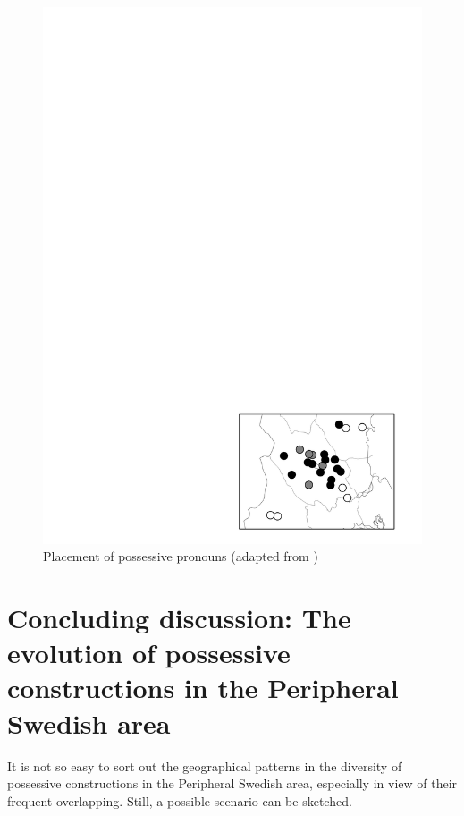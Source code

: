 \begin{figure}[h]

\includegraphics{figures_mod/image21}
\caption{Placement of possessive pronouns (adapted from \citet{Delsing2003a})}
\label{map:21}

\end{figure}

\section{Concluding discussion: The evolution of possessive constructions in the Peripheral Swedish area}

It is not so easy to sort out the geographical patterns in the diversity of possessive constructions in the Peripheral Swedish area, especially in view of their frequent overlapping. Still, a possible scenario can be sketched.

